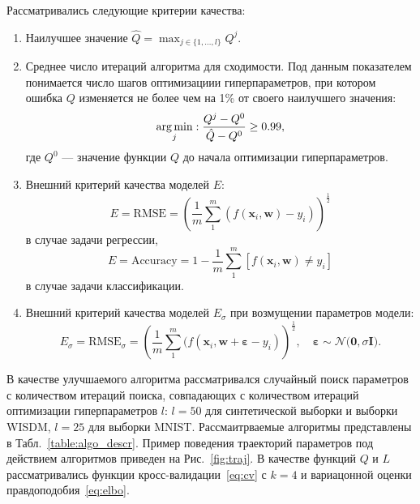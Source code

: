 Рассматривались следующие критерии качества:
\begin{enumerate}
\item Наилучшее значение $\hat{Q} = \max_{j \in \{1, \dots, l\}}Q^j$.
\item Среднее число итераций алгоритма для сходимости. Под данным показателем понимается число шагов оптимизациии гиперпараметров, при котором ошибка $Q$ изменяется не более чем на 1\% от своего наилучшего значения:
\[
    \operatorname*{arg\,min}_{j}: \frac{Q^j - Q^0}{\hat{Q} - Q^0} \geq 0.99,
\]
где $Q^0$ --- значение функции $Q$ до начала оптимизации гиперпараметров.

\item Внешний критерий качества моделей $E$:
\[
    E = \text{RMSE} = \left (\frac{1}{m}\sum_{1}^m (f(\mathbf{x}_i, \mathbf{w})-y_i)\right)^{\frac{1}{2}}
\]
в случае задачи регрессии,
\[
    E = \text{Accuracy} = 1 - \frac{1}{m}\sum_1^m [f(\mathbf{x}_i, \mathbf{w}) \neq y_i]
\]
в случае задачи классификации.

\item Внешний критерий качества моделей $E_\sigma$ при возмущении параметров модели:
\[
    E_\sigma = \text{RMSE}_\sigma = \left (\frac{1}{m}\sum_{1}^m (f(\mathbf{x}_i, \mathbf{w} + \boldsymbol{\varepsilon}-y_i)\right)^{\frac{1}{2}}, \quad \boldsymbol{\varepsilon} \sim \mathcal{N}\bigl(\mathbf{0}, \sigma\mathbf{I}\bigr).
\]
\end{enumerate}

В качестве улучшаемого алгоритма рассматривался случайный поиск параметров с количеством итераций поиска, совпадающих с количеством итераций оптимизации гиперпараметров $l$: $l=50$ для синтетической выборки и выборки WISDM, $l=25$ для выборки MNIST. Рассмаитрваемые алгоритмы представлены в Табл.~\ref{table:algo_descr}. Пример поведения траекторий параметров под действием алгоритмов приведен на Рис.~\ref{fig:traj}. В качестве функций $Q$ и $L$ рассматривались функции кросс-валидации~\eqref{eq:cv} с $k=4$ и вариацонной оценки правдоподобия~\eqref{eq:elbo}. 

